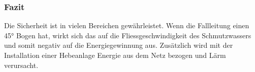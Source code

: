 \subsubsection{Fazit}

Die Sicherheit ist in vielen Bereichen gewährleistet. Wenn die Fallleitung einen 45° Bogen hat, wirkt sich das auf die Fliessgeschwindigkeit des Schmutzwassers und somit negativ auf die Energiegewinnung aus. Zusätzlich wird mit der Installation einer Hebeanlage Energie aus dem Netz bezogen und Lärm verursacht.%

\clearpage 





